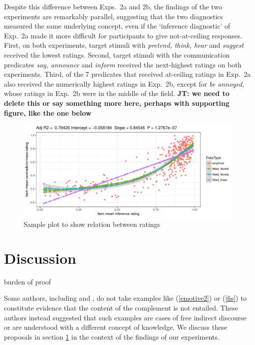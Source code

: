 \documentclass[11pt,fleqn]{article}
\newcommand{\6}{\mbox{$[\hspace*{-.6mm}[$}}
\newcommand{\9}{\mbox{$]\hspace*{-.6mm}]$}}
\newcommand{\jt}[1]{\textbf{\color{blue}JT: #1}}
\begin{document}
{Despite this difference between Exps.~2a and 2b, the findings of the two experiments are remarkably parallel, suggesting that the two diagnostics measured the same underlying concept, even if the `inference diagnostic' of Exp.~2a made it more difficult for participants to give not-at-ceiling responses. First, on both experiments, target stimuli with {\em pretend, think, hear} and {\em suggest} received the lowest ratings. Second, target stimuli with the communication predicates {\em say, announce} and {\em inform} received the next-highest ratings on both experiments. Third, of the 7 predicates that received at-ceiling ratings in Exp.~2a also received the numerically highest ratings in Exp.~2b, except for {\em be annoyed}, whose ratings in Exp.~2b were in the middle of the field. \jt{we need to delete this or say something more here, perhaps with supporting figure, like the one below}

\begin{figure}[h!]
\centering

\includegraphics[width=.75\paperwidth]{../results/4-veridicality3/graphs/by-item-mean-inference-by-mean-contradictoriness-predictions}

\caption{Sample plot to show relation between ratings}
\label{f-relation}
\end{figure}

\newpage

\section{Discussion}\label{s4}

burden of proof

Some authors, including \citet{gazdar79a} and \citet{abrusan2011}, do not take examples like (\ref{emotive2}) or (\ref{fis}) to constitute evidence that the content of the complement is not entailed. These authors instead suggested that such examples are cases of free indirect discourse or are understood with a different concept of knowledge. We discuss these proposals in section \ref{s4} in the context of the findings of our experiments.

}
\end{document}

